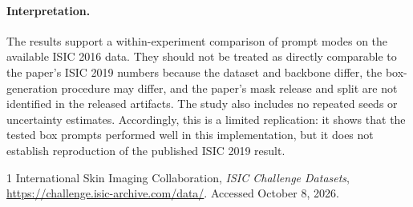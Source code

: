 \paragraph{Interpretation.}
The results support a within-experiment comparison of prompt modes on the
available ISIC 2016 data. They should not be treated as directly comparable
to the paper's ISIC 2019 numbers because the dataset and backbone differ, the
box-generation procedure may differ, and the paper's mask release and split
are not identified in the released artifacts. The study also includes no repeated seeds or
uncertainty estimates. Accordingly, this is a limited replication: it shows
that the tested box prompts performed well in this implementation, but it
does not establish reproduction of the published ISIC 2019 result.

\begin{thebibliography}{1}
International Skin Imaging Collaboration,
\emph{ISIC Challenge Datasets},
\url{https://challenge.isic-archive.com/data/}.
Accessed October 8, 2026.
\end{thebibliography}